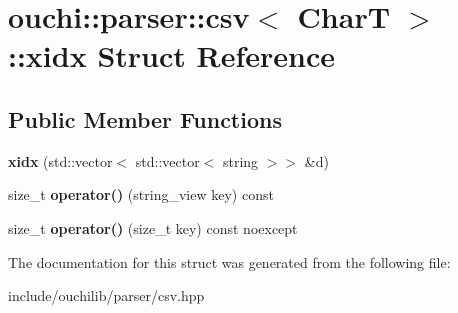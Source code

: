 \hypertarget{structouchi_1_1parser_1_1csv_1_1xidx}{}\section{ouchi\+::parser\+::csv$<$ CharT $>$\+::xidx Struct Reference}
\label{structouchi_1_1parser_1_1csv_1_1xidx}
\subsection*{Public Member Functions}
\begin{DoxyCompactItemize}
\item 
\mbox{\label{structouchi_1_1parser_1_1csv_1_1xidx_ae0d9d55b7042858fdc2cbb74df8e870c}} 
{\bfseries xidx} (std\+::vector$<$ std\+::vector$<$ string $>$$>$ \&d)
\item 
\mbox{\label{structouchi_1_1parser_1_1csv_1_1xidx_a8fb774dee697cef2452c21b697b85bf7}} 
size\+\_\+t {\bfseries operator()} (string\+\_\+view key) const
\item 
\mbox{\label{structouchi_1_1parser_1_1csv_1_1xidx_abf86c4180fc87a3f0b9e2689a174988c}} 
size\+\_\+t {\bfseries operator()} (size\+\_\+t key) const noexcept
\end{DoxyCompactItemize}


The documentation for this struct was generated from the following file\+:\begin{DoxyCompactItemize}
\item 
include/ouchilib/parser/csv.\+hpp\end{DoxyCompactItemize}
